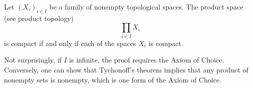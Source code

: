 \documentclass{article}
\begin{document}
Let $(X_i)_{i\in I}$ be a family of nonempty topological spaces. The product space (see product topology)
$$\prod_{i\in I}X_i$$
is compact if and only if each of the spaces $X_i$ is compact.

Not surprisingly, if $I$ is infinite, the proof requires the Axiom of Choice. Conversely, one can show that Tychonoff's theorem implies that any product of nonempty sets is nonempty, which is one form of the Axiom of Choice.
\end{document}
